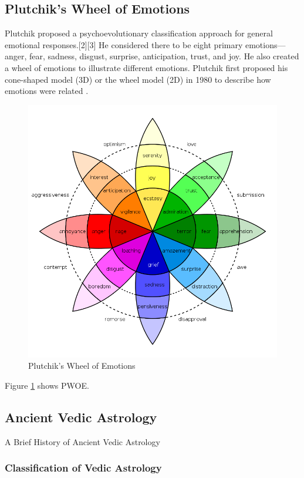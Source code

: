 \subsection{Plutchik's Wheel of Emotions}
Plutchik proposed a psychoevolutionary classification approach for general emotional responses.[2][3] He considered there to be eight primary emotions—anger, fear, sadness, disgust, surprise, anticipation, trust, and joy.
He also created a wheel of emotions to illustrate different emotions. Plutchik first proposed his cone-shaped model (3D) or the wheel model (2D) in 1980 to describe how emotions were related \cite{enwiki:1136521972}.
\begin{figure}[H]
	\includegraphics[width=\columnwidth, keepaspectratio]{Plutchik'sWheelofEmotions.png}
	\caption{Plutchik's Wheel of Emotions}
	\label{Fig:fig1}
\end{figure}
Figure \ref{Fig:fig1} shows PWOE.
\subsection{Ancient Vedic Astrology}
A Brief History of Ancient Vedic Astrology
\subsubsection{Classification of Vedic Astrology}
